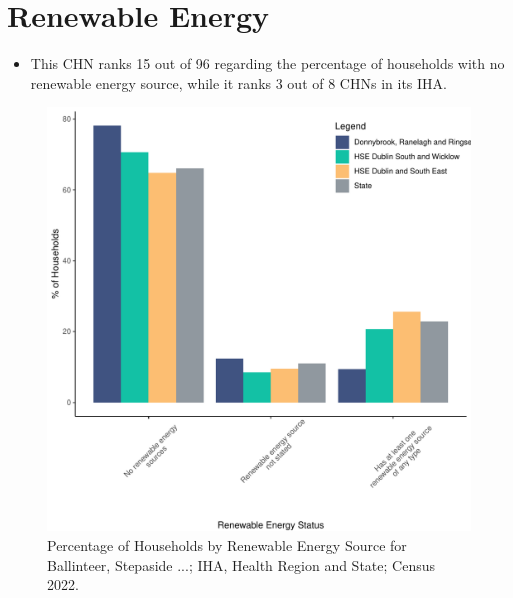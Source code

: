 \documentclass{article}
\begin{document}
\section{Renewable Energy}\label{sect:RE}
\begin{itemize}
\item This CHN ranks  15 out of 96 regarding the percentage of households with no renewable energy source, while it ranks   3 out of 8 CHNs in its IHA.
\end{itemize}
\begin{figure}[H]
	\centering
	\includegraphics[width = 140mm]{../figures/RenewableEnergyED.pdf}
	\caption{Percentage of Households by Renewable Energy Source for Ballinteer, Stepaside ...; IHA, Health Region and State; Census 2022.}
	\label{fig:vbnv}
	\end{figure}
\end{document}

